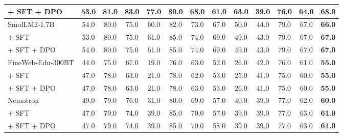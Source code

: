 \begin{table}[ht]
{\begin{tabular}{lcccccccccccc}
\quad + SFT + DPO & 53.0 & 81.0 & 83.0 & 77.0 & 80.0 & 68.0 & 61.0 & 63.0 & 39.0 & 76.0 & 64.0 & \textbf{68.0} \\
\midrule
\addlinespace[0.3em]
SmolLM2-1.7B       & 54.0 & 80.0 & 75.0 & 60.0 & 82.0 & 73.0 & 67.0 & 50.0 & 44.0 & 79.0 & 67.0 & \textbf{66.0} \\
\quad + SFT & 53.0 & 80.0 & 75.0 & 61.0 & 85.0 & 74.0 & 69.0 & 49.0 & 43.0 & 79.0 & 67.0 & \textbf{67.0} \\
\quad + SFT + DPO & 54.0 & 80.0 & 75.0 & 61.0 & 85.0 & 74.0 & 69.0 & 49.0 & 43.0 & 79.0 & 67.0 & \textbf{67.0} \\
\midrule
\addlinespace[0.3em]
FineWeb-Edu-300BT & 44.0 & 75.0 & 67.0 & 19.0 & 76.0 & 63.0 & 52.0 & 26.0 & 42.0 & 76.0 & 61.0 & \textbf{55.0} \\
\quad + SFT & 47.0 & 78.0 & 63.0 & 21.0 & 78.0 & 62.0 & 53.0 & 25.0 & 41.0 & 75.0 & 60.0 & \textbf{55.0} \\
\quad + SFT + DPO & 47.0 & 78.0 & 63.0 & 21.0 & 78.0 & 63.0 & 53.0 & 26.0 & 41.0 & 75.0 & 60.0 & \textbf{55.0} \\
\midrule
\addlinespace[0.3em]
Nemotron       & 49.0 & 79.0 & 76.0 & 31.0 & 80.0 & 69.0 & 57.0 & 40.0 & 39.0 & 77.0 & 62.0 & \textbf{60.0} \\
\quad + SFT & 47.0 & 79.0 & 74.0 & 39.0 & 85.0 & 70.0 & 57.0 & 39.0 & 39.0 & 77.0 & 63.0 & \textbf{61.0} \\
\quad + SFT + DPO & 47.0 & 79.0 & 74.0 & 39.0 & 85.0 & 70.0 & 58.0 & 39.0 & 39.0 & 77.0 & 63.0 & \textbf{61.0} \\
\bottomrule
\end{tabular}%
}
\end{table}


